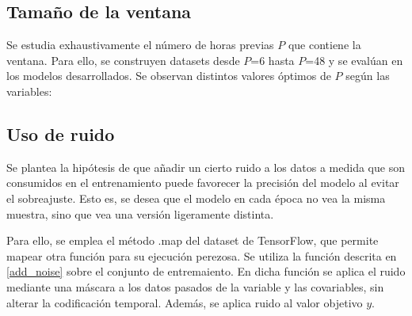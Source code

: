 \subsection{Tamaño de la ventana}
Se estudia exhaustivamente el número de horas previas $P$ que contiene la ventana. Para ello, se construyen datasets desde $P$=6 hasta $P$=48 y se evalúan en los modelos 
desarrollados. Se observan distintos valores óptimos de $P$ según las variables:

\subsection{Uso de ruido}
Se plantea la hipótesis de que añadir un cierto ruido a los datos a medida que son consumidos en el entrenamiento puede favorecer la precisión del modelo al evitar el sobreajuste.
Esto es, se desea que el modelo en cada época no vea la misma muestra, sino que vea una versión ligeramente distinta. 

Para ello, se emplea el método .map del dataset de TensorFlow, que permite mapear otra función para su ejecución perezosa.
Se utiliza la función descrita en \ref{add_noise} sobre el conjunto de entremaiento. En dicha función se aplica el ruido mediante una máscara
a los datos pasados de la variable y las covariables, sin alterar la codificación temporal. Además, se aplica ruido al valor objetivo $y$.

